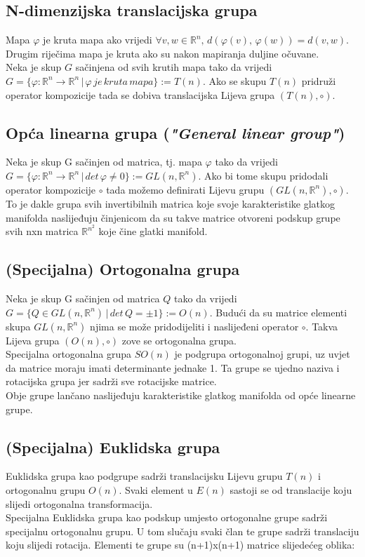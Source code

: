 \documentclass[times, utf8, diplomski]{fer}
\begin{document}
	\subsection{N-dimenzijska translacijska grupa} Mapa $\varphi$ je kruta mapa ako vrijedi 
	$\forall v, w \in \mathbb{R}^n, \, d(\varphi(v), \, \varphi(w)) = d(v, w)$. Drugim riječima mapa je kruta ako su nakon mapiranja duljine očuvane. \\
	Neka je skup $G$ sačinjena od svih krutih mapa tako da vrijedi $G = \{ \varphi: \mathbb{R}^n \rightarrow \mathbb{R}^n \, | \, \varphi\, je\, kruta\, mapa\} := T(n)$. Ako se skupu $T(n)$ pridruži operator kompozicije tada se dobiva translacijska Lijeva grupa $(T(n), \circ)$.
	
	\subsection{Opća linearna grupa (\textit{"General linear group"})} Neka je skup G sačinjen od matrica, tj. mapa $\varphi$ tako da vrijedi $G = \{ \varphi: \mathbb{R}^n \rightarrow \mathbb{R}^n \,|\, det \, \varphi \neq 0 \}:=GL(n, \mathbb{R}^n)$. Ako bi tome skupu pridodali operator kompozicije $\circ$ tada možemo definirati Lijevu grupu $(GL(n, \mathbb{R}^n), \circ)$. To je dakle grupa svih invertibilnih matrica koje svoje karakteristike glatkog manifolda naslijeđuju činjenicom da su takve matrice otvoreni podskup grupe svih nxn matrica $\mathbb{R}^{n^2}$ koje čine glatki manifold.
	
	\subsection{(Specijalna) Ortogonalna grupa} Neka je skup G sačinjen od matrica $Q$ tako da vrijedi \\ 
	$G = \{ Q \in GL(n, \mathbb{R}^n) \,|\, det \, Q = \pm 1\} := O(n)$. Budući da su matrice elementi skupa $GL(n, \mathbb{R}^n)$ njima se može pridodijeliti i naslijeđeni operator $\circ$. Takva Lijeva grupa $(O(n),\circ)$ zove se ortogonalna grupa. \\
	Specijalna ortogonalna grupa $SO(n)$ je podgrupa ortogonalnoj grupi, uz uvjet da matrice moraju imati determinante jednake 1. Ta grupe se ujedno naziva i rotacijska grupa jer sadrži sve rotacijske matrice. \\
	Obje grupe lančano naslijeđuju karakteristike glatkog manifolda od opće linearne grupe.
	
	\subsection{(Specijalna) Euklidska grupa} Euklidska grupa kao podgrupe sadrži translacijsku Lijevu grupu $T(n)$ i ortogonalnu grupu $O(n)$. Svaki element u $E(n)$ sastoji se od translacije koju slijedi ortogonalna transformacija. \\
	Specijalna Euklidska grupa kao podskup umjesto ortogonalne grupe sadrži specijalnu ortogonalnu grupu. U tom slučaju svaki član te grupe sadrži translaciju koju slijedi rotacija. Elementi te grupe su (n+1)x(n+1) matrice slijedećeg oblika: \\
	
\end{document}
